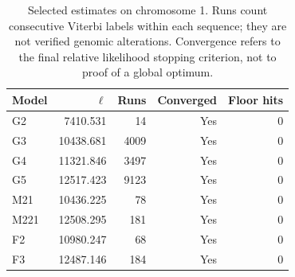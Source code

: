 \begin{table}[htbp]
\centering
\small
\caption{Selected estimates on chromosome 1. Runs count consecutive Viterbi labels within each sequence; they are not verified genomic alterations. Convergence refers to the final relative likelihood stopping criterion, not to proof of a global optimum.}
\label{tab:si-genomic-estimation}
\begin{tabular}{lrrrr}
\toprule
Model & $\ell$ & Runs & Converged & Floor hits \\
\midrule
G2 & 7410.531 & 14 & Yes & 0 \\
G3 & 10438.681 & 4009 & Yes & 0 \\
G4 & 11321.846 & 3497 & Yes & 0 \\
G5 & 12517.423 & 9123 & Yes & 0 \\
M21 & 10436.225 & 78 & Yes & 0 \\
M221 & 12508.295 & 181 & Yes & 0 \\
F2 & 10980.247 & 68 & Yes & 0 \\
F3 & 12487.146 & 184 & Yes & 0 \\
\bottomrule
\end{tabular}
\end{table}
